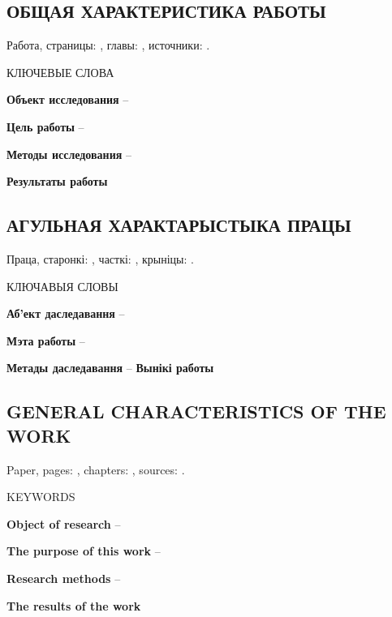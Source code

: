 
\begin{center}
    \chapter*{ОБЩАЯ ХАРАКТЕРИСТИКА РАБОТЫ}
\end{center}

Работа, страницы: \pageref{LastPage}, главы: , источники: .

КЛЮЧЕВЫЕ СЛОВА

\phantom{}

\textbf{Объект исследования} --

\textbf{Цель работы} -- 

\textbf{Методы исследования} --

\textbf{Результаты работы}

\newpage
\begin{center}
    \chapter*{АГУЛЬНАЯ ХАРАКТАРЫСТЫКА ПРАЦЫ}
\end{center}

Праца, старонкі: \pageref{LastPage}, часткі: , крыніцы: .

КЛЮЧАВЫЯ СЛОВЫ

\phantom{}

\textbf{Аб'ект даследавання} --

\textbf{Мэта работы} --

\textbf{Метады даследавання} --
\textbf{Вынікі работы}

\newpage
\begin{center}
    \chapter*{GENERAL CHARACTERISTICS OF THE WORK}
\end{center}

Paper, pages: \pageref{LastPage}, chapters: , sources: .

KEYWORDS

\phantom{}

\textbf{Object of research} --

\textbf{The purpose of this work} --

\textbf{Research methods} --

\textbf{The results of the work}

